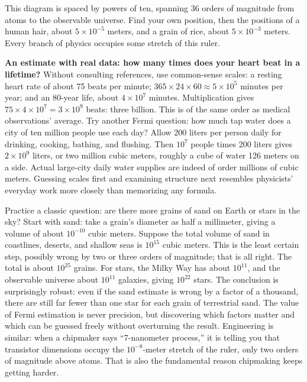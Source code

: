 This diagram is spaced by powers of ten, spanning 36 orders of magnitude from atoms to the observable universe. Find your own position, then the positions of a human hair, about $5\times10^{-5}$ meters, and a grain of rice, about $5\times10^{-3}$ meters. Every branch of physics occupies some stretch of this ruler.

\textbf{An estimate with real data: how many times does your heart beat in a lifetime?} Without consulting references, use common-sense scales: a resting heart rate of about 75 beats per minute; $365\times24\times60 \approx 5\times10^5$ minutes per year; and an 80-year life, about $4\times10^7$ minutes. Multiplication gives $75 \times 4\times10^7 = 3\times10^9$ beats: three billion. This is of the same order as medical observations' average. Try another Fermi question: how much tap water does a city of ten million people use each day? Allow 200 liters per person daily for drinking, cooking, bathing, and flushing. Then $10^7$ people times 200 liters gives $2\times10^9$ liters, or two million cubic meters, roughly a cube of water 126 meters on a side. Actual large-city daily water supplies are indeed of order millions of cubic meters. Guessing scales first and examining structure next resembles physicists' everyday work more closely than memorizing any formula.

Practice a classic question: are there more grains of sand on Earth or stars in the sky? Start with sand: take a grain's diameter as half a millimeter, giving a volume of about $10^{-10}$ cubic meters. Suppose the total volume of sand in coastlines, deserts, and shallow seas is $10^{15}$ cubic meters. This is the least certain step, possibly wrong by two or three orders of magnitude; that is all right. The total is about $10^{25}$ grains. For stars, the Milky Way has about $10^{11}$, and the observable universe about $10^{11}$ galaxies, giving $10^{22}$ stars. The conclusion is surprisingly robust: even if the sand estimate is wrong by a factor of a thousand, there are still far fewer than one star for each grain of terrestrial sand. The value of Fermi estimation is never precision, but discovering which factors matter and which can be guessed freely without overturning the result. Engineering is similar: when a chipmaker says ``7-nanometer process,'' it is telling you that transistor dimensions occupy the $10^{-8}$-meter stretch of the ruler, only two orders of magnitude above atoms. That is also the fundamental reason chipmaking keeps getting harder.


